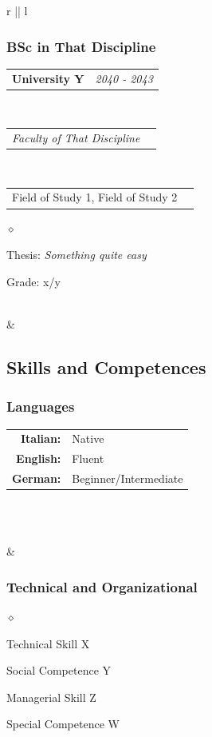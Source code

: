 \documentclass[a4paper]{article}
\makeatletter
\newlength{\sectsep}
\newlength{\subsectsep}
\newcommand{\headerrow}[2]
{\begin{tabular*}{\textwidth}{l@{\extracolsep{\fill}}r}
	#1 &
	#2 \\
\end{tabular*}}
\renewenvironment{itemize}{
  \begin{list}{$\diamond$}{
    \setlength{\topsep}{0.25em}
    \setlength{\itemsep}{0em}
    \setlength{\parskip}{0pt}
    \setlength{\parsep}{0em}
  }
}{
  \end{list}
}
\makeatother
\begin{document}
\begin{longtable}{r || l}
\begin{minipage}{0.9\textwidth}
      \subsubsection*{BSc in That Discipline}
      \headerrow
  		{\textbf{University Y}}{\emph{2040 - 2043}}
      \\
      \headerrow
        {\emph{Faculty of That Discipline}}{}
      \\
      \headerrow
        {Field of Study 1, Field of Study 2}{}

      \begin{itemize}
          \item Thesis: \emph{Something quite easy}
          \item Grade: x/y
      \end{itemize}
      \vfill
  \end{minipage} \\[\sectsep]

  & \begin{minipage}{0.9\textwidth}
      \vspace{\sectsep}
      \subsection*{Skills and Competences}
      \subsubsection*{Languages}
      \begin{tabular}{rl}
        \textbf{Italian:}&Native\\
        \textbf{English:}&Fluent\\
        \textbf{German:}&Beginner/Intermediate\\
      \end{tabular} \vspace{1.5ex} \\
    \end{minipage} \\[\sectsep]

  & \begin{minipage}{0.9\textwidth}
      \vspace{\subsectsep}
      \subsubsection*{Technical and Organizational}
      \begin{itemize}
          \item Technical Skill X
          \item Social Competence Y
          \item Managerial Skill Z
          \item Special Competence W
      \end{itemize}
  \end{minipage} \\[\sectsep]


\end{longtable}
\end{document}
